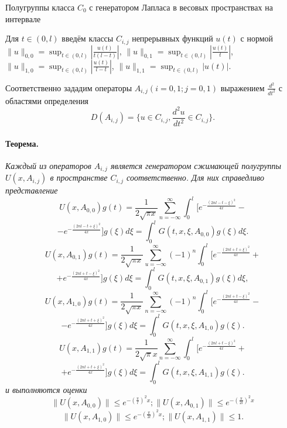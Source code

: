 \vzmstitle
{
	Полугруппы класса $C_0$ с генератором Лапласа в весовых пространствах на интервале
}


\vzmscaption

Для $t\in(0,l)$ введём классы $C_{i,j}$ непрерывных функций $u(t)$ с нормой
$ \|u\|_{0,0}=\sup_{t\in(0,l)} |\frac{u(t)}{t(l-t)}|$, $\|u\|_{0,1}=\sup_{t\in(0,l)} |\frac{u(t)}{t}|$, $\|u\|_{1,0}=\sup_{t\in(0,l)} |\frac{u(t)}{l-t}|$, $\|u\|_{1,1}=\sup_{t\in(0,l)} |u(t)|$.

Соответственно зададим операторы $A_{i, j}(i = 0, 1; j = 0, 1)$
 выражением $\frac{d^2}{dt^2}$ с областями
определения $$D(A_{i, j}) = \{ u \in C_{i, j},
\frac{d^2u}{dt^2} \in C_{i, j} \}.$$
\paragraph{Теорема.} {\it
	Каждый из операторов $A_{i,j}$ является генератором сжимающей полугруппы
$U(x,A_{i,j})$ в пространстве $C_{i,j}$ соответственно. Для них справедливо представление
$$
U(x,A_{0,0})g(t)=\frac{1}{2\sqrt{\pi x}}\sum_{n=-\infty}^{\infty}\int_{0}^{l}[e^{-\frac{(2nl-t-\xi)^2}{4x}}-
$$
$$-e^{-\frac{(2nl-t+\xi)^2}{4x}}]g(\xi)d\xi=\int_{0}^{l}G(t,x,\xi,A_{0,0})g(\xi)d\xi.$$
$$U(x,A_{0,1})g(t)=\frac{1}{2\sqrt{\pi
x}}\sum_{u=-\infty}^{\infty}(-1)^{n}\int_{0}^{l}[e^{-\frac{(2nl+t+\xi)^2}{4x}}+$$ $$+e^{-\frac{(2nl+t-\xi)^2}{4x}}]g(\xi)d\xi=
\int_{0}^{l}G(t,x,\xi,A_{0,1})g(\xi)d\xi,$$
$$U(x,A_{1,0})g(t)=\frac{1}{2\sqrt{\pi x}}\sum_{n=-\infty}^{\infty}(-1)^n\int_{0}^{l}[e^{-\frac{(2nl+t-\xi)^2}{4x}}
-$$ $$- e^{-\frac{(2nl+t+\xi)^2}{4x}}]g(\xi)d\xi=\int_{0}^{l}G(t,x,\xi,A_{1,0})g(\xi).$$ $$
U(x,A_{1,1})g(t)=\frac{1}{2\sqrt{\pi}x}\sum_{n=-\infty}^{\infty}
\int_{0}^{l}[e^{-\frac{(2nl+t-\xi)^2}{4x}}+$$ $$+e^{-\frac{(2nl+t+\xi)^2}{4x}}]g(\xi)d\xi=\int_{0}^{l}G(t,x,\xi,A_{1,1})g(\xi).$$
 и выполняются оценки
 $$
\|U(x,A_{0,0})\|\leq e^{-(\frac{\pi}{l})^{2}x};\|U(x,A_{0,1})\|\leq e^{-(\frac{\pi}{2l})^{2}x}$$
$$\|U(x,A_{1,0})\|\leq e^{-(\frac{\pi}{2l})^{2}x};\|U(x,A_{1,1})\|\leq
1.$$}
